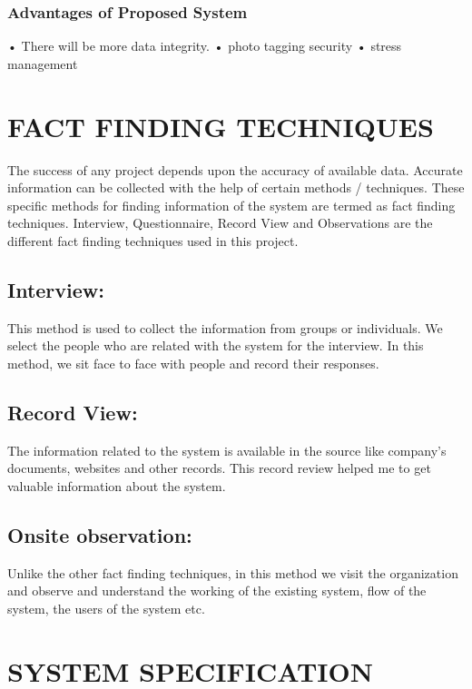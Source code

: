 \documentclass[a4paper,12pt]{article}
\begin{document}
\subsubsection{ Advantages of Proposed System }
\hspace{5mm}
•	There will be more data integrity.
•	photo tagging security
•	stress management
\newpage
\section{FACT FINDING TECHNIQUES}
\hspace{5mm}
The success of any project depends upon the accuracy of available data. Accurate information can be collected with the help of certain methods / techniques. These specific methods for finding information of the system are termed as fact finding techniques. Interview, Questionnaire, Record View and Observations are the different fact finding techniques used in this project. 
\subsection{Interview:}
\hspace{5mm}
This method is used to collect the information from groups or individuals. We select the people who are related with the system for the interview. In this method, we sit face to face with people and record their responses.
\subsection{Record View:}
\hspace{5mm}
The information related to the system is available in the source like company’s documents, websites and other records. This record review helped me to get valuable information about the system.
\subsection{Onsite observation: }
\hspace{5mm}
 Unlike the other fact finding techniques, in this method we visit the organization and observe and understand the working of the existing system, flow of the system, the users of the system etc.

\newpage
\section{ SYSTEM SPECIFICATION }
\hspace{5mm}
\end{document}

